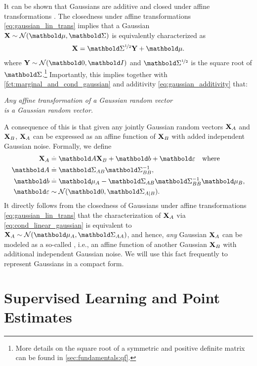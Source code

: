It can be shown that Gaussians are additive and closed under affine transformations .
The closedness under affine transformations \eqref{eq:gaussian_lin_trans} implies that a Gaussian $\rX \sim \N{\vmu}{\mSigma}$ is equivalently characterized as \begin{align}
  \rX = \msqrt{\mSigma} \rY + \vmu. \label{eq:gaussian_affine_transformation}
\end{align} where $\rY \sim \SN$ and $\msqrt{\mSigma}$ is the square root of $\mSigma$.\footnote{More details on the square root of a symmetric and positive definite matrix can be found in \cref{sec:fundamentals:qf}.}
Importantly, this implies together with \cref{fct:marginal_and_cond_gaussian} and additivity \eqref{eq:gaussian_additivity} that: \begin{center}
  \emph{Any affine transformation of a Gaussian random vector \\ is a Gaussian random vector.}
\end{center}
A consequence of this is that given any jointly Gaussian random vectors $\mathbf{X}_A$ and $\mathbf{X}_B$, $\mathbf{X}_A$ can be expressed as an affine function of $\mathbf{X}_B$ with added independent Gaussian noise.
Formally, we define \begin{subequations}\begin{align}
  \rX_\sA &\defeq \mA \rX_\sB + \vb + \vvarepsilon \quad\text{where} \\
  \mA &\defeq \mSigma_{\sA\sB}\inv{\mSigma_{\sB\sB}}, \\
  \vb &\defeq \vmu_A - \mSigma_{\sA\sB}\inv{\mSigma_{\sB\sB}} \vmu_B, \\
  \vvarepsilon &\sim \N{\vzero}{\mSigma_{\sA\mid\sB}}.
\end{align}\label{eq:cond_linear_gaussian}\end{subequations}
It directly follows from the closedness of Gaussians under affine transformations \eqref{eq:gaussian_lin_trans} that the characterization of $\mathbf{X}_A$ via \cref{eq:cond_linear_gaussian} is equivalent to $\rX_\sA \sim \N{\vmu_\sA}{\mSigma_{\sA\sA}}$, and hence, \emph{any} Gaussian $\mathbf{X}_A$ can be modeled as a so-called , i.e., an affine function of another Gaussian $\mathbf{X}_B$ with additional independent Gaussian noise.
We will use this fact frequently to represent Gaussians in a compact form.

\section{Supervised Learning and Point Estimates}\label{sec:fundamentals:supervised_learning}

